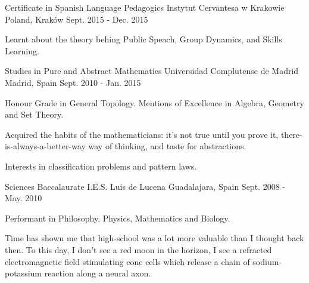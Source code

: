 

\begin{cventries}

  \cventry
    {Certificate in Spanish Language Pedagogics} %
    {Instytut Cervantesa w Krakowie} %
    {Poland, Kraków} %
    {Sept. 2015 - Dec. 2015} %
    {
      \begin{cvitems} %
        \item {Learnt about the theory behing Public Speach, Group Dynamics, and Skills Learning.}
      \end{cvitems}
    }

\cventry
	{Studies in Pure and Abstract Mathematics} %
	{Universidad Complutense de Madrid} %
	{Madrid, Spain} %
	{Sept. 2010 - Jan. 2015} %
	{
		\begin{cvitems} %
			\item {Honour Grade in General Topology. Mentions of Excellence in Algebra, Geometry and Set Theory.}
			\item {Acquired the habits of the mathematicians: it's not true until you prove it, there-is-always-a-better-way way of thinking, and taste for abstractions.}
			\item {Interests in classification problems and pattern laws.}
		\end{cvitems}
	}

\cventry
	{Sciences Baccalaurate} %
	{I.E.S. Luis de Lucena} %
	{Guadalajara, Spain} %
	{Sept. 2008 - May. 2010} %
	{
		\begin{cvitems} %
			\item {Performant in Philosophy, Physics, Mathematics and Biology.}
			\item {Time has shown me that high-school was a lot more valuable than I thought back then. To this day, I don't see a red moon in the horizon, I see a refracted electromagnetic field stimulating cone cells which release a chain of sodium-potassium reaction along a neural axon.}
		\end{cvitems}
	}

\end{cventries}
